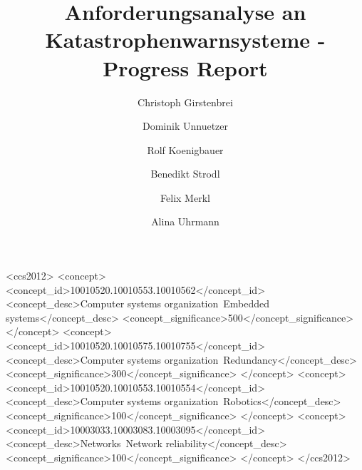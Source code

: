 \documentclass[sigchi-a, authorversion]{acmart}
\begin{document}
\title{Anforderungsanalyse an Katastrophenwarnsysteme - Progress Report}

\author{Christoph Girstenbrei}

\author{Dominik Unnuetzer}

\author{Rolf Koenigbauer}

\author{Benedikt Strodl}

\author{Felix Merkl}

\author{Alina Uhrmann}

\renewcommand{\shortauthors}{F. Author et al.}


%
%
\begin{CCSXML}
<ccs2012>
 <concept>
  <concept_id>10010520.10010553.10010562</concept_id>
  <concept_desc>Computer systems organization~Embedded systems</concept_desc>
  <concept_significance>500</concept_significance>
 </concept>
 <concept>
  <concept_id>10010520.10010575.10010755</concept_id>
  <concept_desc>Computer systems organization~Redundancy</concept_desc>
  <concept_significance>300</concept_significance>
 </concept>
 <concept>
  <concept_id>10010520.10010553.10010554</concept_id>
  <concept_desc>Computer systems organization~Robotics</concept_desc>
  <concept_significance>100</concept_significance>
 </concept>
 <concept>
  <concept_id>10003033.10003083.10003095</concept_id>
  <concept_desc>Networks~Network reliability</concept_desc>
  <concept_significance>100</concept_significance>
 </concept>
</ccs2012>  
\end{CCSXML}
\end{document}
